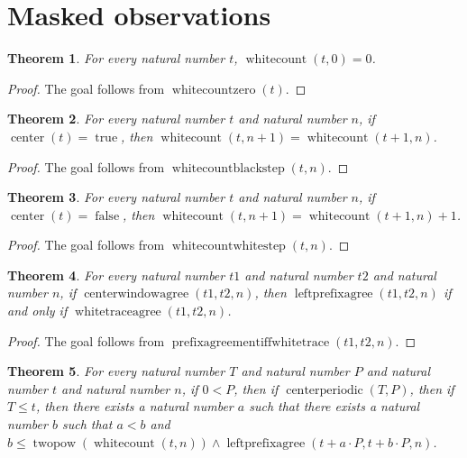 \documentclass[11pt]{article}
\newtheorem{theorem}{Theorem}[section]
\theoremstyle{definition}
\begin{document}
\section{Masked observations}
\label{ll:observations:masked-observations}
\begin{theorem}
\label{ll:observations:white-count-zero}
For every natural number \(t\), \(\operatorname{whitecount}(t, 0) = 0\).
\end{theorem}
\begin{proof}
The goal follows from \(\operatorname{whitecountzero}(t)\).
\end{proof}
\begin{theorem}
\label{ll:observations:white-count-black-step}
For every natural number \(t\) and natural number \(n\), if \(\operatorname{center}(t) = \operatorname{true}\), then \(\operatorname{whitecount}(t, n + 1) = \operatorname{whitecount}(t + 1, n)\).
\end{theorem}
\begin{proof}
The goal follows from \(\operatorname{whitecountblackstep}(t, n)\).
\end{proof}
\begin{theorem}
\label{ll:observations:white-count-white-step}
For every natural number \(t\) and natural number \(n\), if \(\operatorname{center}(t) = \operatorname{false}\), then \(\operatorname{whitecount}(t, n + 1) = \operatorname{whitecount}(t + 1, n) + 1\).
\end{theorem}
\begin{proof}
The goal follows from \(\operatorname{whitecountwhitestep}(t, n)\).
\end{proof}
\begin{theorem}
\label{ll:observations:prefix-agreement-iff-white-trace}
For every natural number \(t1\) and natural number \(t2\) and natural number \(n\), if \(\operatorname{centerwindowagree}(t1, t2, n)\), then \(\operatorname{leftprefixagree}(t1, t2, n)\) if and only if \(\operatorname{whitetraceagree}(t1, t2, n)\).
\end{theorem}
\begin{proof}
The goal follows from \(\operatorname{prefixagreementiffwhitetrace}(t1, t2, n)\).
\end{proof}
\begin{theorem}
\label{ll:observations:compressed-prefix-repeat}
For every natural number \(T\) and natural number \(P\) and natural number \(t\) and natural number \(n\), if \(0 < P\), then if \(\operatorname{centerperiodic}(T, P)\), then if \(T \le t\), then there exists a natural number \(a\) such that there exists a natural number \(b\) such that \(a < b\) and \(b \le \operatorname{twopow}(\operatorname{whitecount}(t, n)) \land \operatorname{leftprefixagree}(t + a \cdot P, t + b \cdot P, n)\).
\end{theorem}
\end{document}
